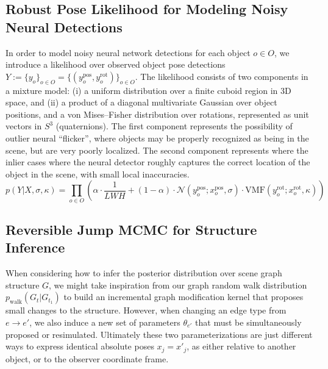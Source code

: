 \subsection{Robust Pose Likelihood for Modeling Noisy Neural Detections}
In order to model noisy neural network detections for each object $o \in O$, we introduce a likelihood over observed object pose detections $Y := \{y_o\}_{o \in O} = \{(y_o^\mathrm{pos}, y_o^\mathrm{rot})\}_{o \in O}$.
The likelihood consists of two components in a mixture model:
(i) a uniform distribution over a finite cuboid region in 3D space, and
(ii) a product of a diagonal multivariate Gaussian over object positions, and a von Mises--Fisher distribution over rotations, represented as unit vectors in $S^3$ (quaternions).
The first component represents the possibility of outlier neural ``flicker'', where objects may be properly recognized as being in the scene, but are very poorly localized.
The second component represents where the inlier cases where the neural detector roughly captures the correct location of the object in the scene, with small local inaccuracies.
\begin{equation} \label{eq:noisy-pose-likelihood}
  p(Y | X, \sigma, \kappa) =
  \prod_{o \in O}
    \left(\alpha \cdot \frac{1}{LWH} +
    (1 - \alpha) \cdot \mathcal{N}\left(y_o^\mathrm{pos}; x_o^\mathrm{pos}, \sigma\right) \cdot
    \mathrm{VMF}(y_o^\mathrm{rot}; x_o^\mathrm{rot}, \kappa)\right)
\end{equation}


\subsection{Reversible Jump MCMC for Structure Inference}
When considering how to infer the posterior distribution over scene graph structure $G$, we might take inspiration from our graph random walk distribution $p_\mathrm{walk}(G_t|G_{t_1})$ to build an incremental graph modification kernel that proposes small changes to the structure.
However, when changing an edge type from $e \to e'$, we also induce a new set of parameters $\theta_{e'}$ that must be simultaneously proposed or resimulated.
Ultimately these two parameterizations are just different ways to express identical absolute poses $x_j = x'_j$, as either relative to another object, or to the observer coordinate frame.

